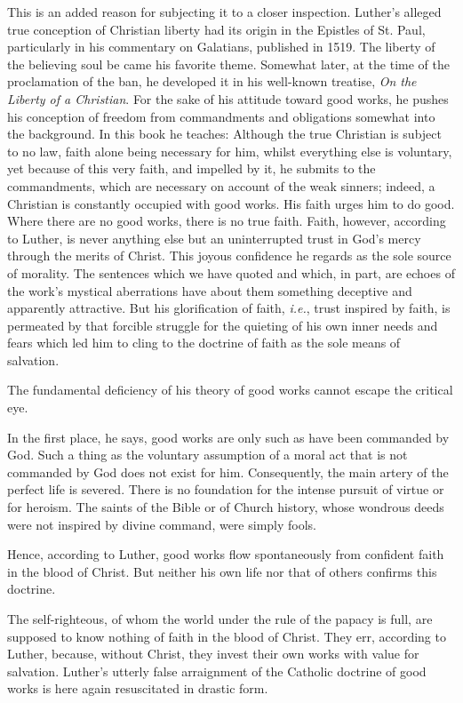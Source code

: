 This is an added reason for subjecting it to a closer inspection.
Luther’s alleged true conception of Christian liberty had its origin
in the Epistles of St. Paul, particularly in his commentary on
Galatians, published in 1519. The liberty of the believing soul be
came his favorite theme. Somewhat later, at the time of the proclamation
of the ban, he developed it in his well-known treatise, \textit{On the
Liberty of a Christian}. For the sake of his attitude toward good
works, he pushes his conception of freedom from commandments and
obligations somewhat into the background. In this book he teaches:
Although the true Christian is subject to no law, faith alone being
necessary for him, whilst everything else is voluntary, yet because
of this very faith, and impelled by it, he submits to the commandments,
which are necessary on account of the weak sinners; indeed, a
Christian is constantly occupied with good works. His faith urges
him to do good. Where there are no good works, there is no true
faith. Faith, however, according to Luther, is never anything else but
an uninterrupted trust in God’s mercy through the merits of Christ.
This joyous confidence he regards as the sole source of morality. The
sentences which we have quoted and which, in part, are echoes of the
work’s mystical aberrations have about them something deceptive and
apparently attractive. But his glorification of faith, \textit{i.e.}, trust inspired
by faith, is permeated by that forcible struggle for the quieting of his
own inner needs and fears which led him to cling to the
doctrine of faith as the sole means of salvation.

The fundamental deficiency of his theory of good works cannot
escape the critical eye.

In the first place, he says, good works are only such as have been
commanded by God. Such a thing as the voluntary assumption of a
moral act that is not commanded by God does not exist for him.
Consequently, the main artery of the perfect life is severed. There is
no foundation for the intense pursuit of virtue or for heroism. The
saints of the Bible or of Church history, whose wondrous deeds
were not inspired by divine command, were simply fools.

Hence, according to Luther, good works flow spontaneously from
confident faith in the blood of Christ. But neither his own life nor
that of others confirms this doctrine.

The self-righteous, of whom the world under the rule of the
papacy is full, are supposed to know nothing of faith in the blood
of Christ. They err, according to Luther, because, without Christ,
they invest their own works with value for salvation. Luther’s utterly
false arraignment of the Catholic doctrine of good works is here
again resuscitated in drastic form.

